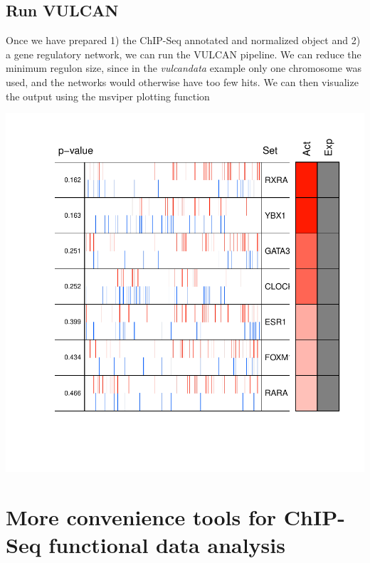 \documentclass{article}
\begin{document}
\subsection{Run VULCAN}
Once we have prepared 1) the ChIP-Seq annotated and normalized object and 2) a gene regulatory network, we can run the VULCAN pipeline.
We can reduce the minimum regulon size, since in the \emph{vulcandata} example only one chromosome was used, and the networks would otherwise have too few hits. We can then visualize the output using the msviper plotting function
\begin{Schunk}
\end{Schunk}
\includegraphics{vulcan-010}


\section{More convenience tools for ChIP-Seq functional data analysis}
\end{document}
